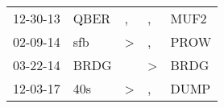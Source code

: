 \begin{supertabular}{p{0.07\textwidth}p{0.06\textwidth}p{0.02\textwidth}p{0.02\textwidth}p{0.06\textwidth}}
 12-30-13\textsuperscript{} &  QBER\textsuperscript{} &             , &             , &  MUF2\textsuperscript{} \\
 02-09-14\textsuperscript{} &   sfb\textsuperscript{} &  \textgreater &             , &  PROW\textsuperscript{} \\
 03-22-14\textsuperscript{} &  BRDG\textsuperscript{} &               &  \textgreater &  BRDG\textsuperscript{} \\
 12-03-17\textsuperscript{} &   40s\textsuperscript{} &  \textgreater &             , &  DUMP\textsuperscript{} \\
\end{supertabular}
